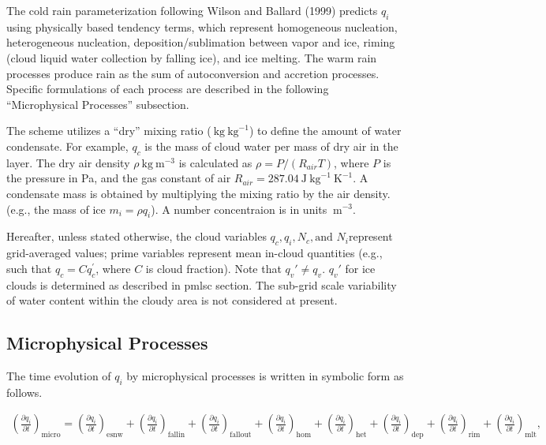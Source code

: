 The cold rain parameterization following Wilson and Ballard (1999)
predicts \(q_i\) using physically based tendency terms, which represent
homogeneous nucleation, heterogeneous nucleation, deposition/sublimation
between vapor and ice, riming (cloud liquid water collection by falling
ice), and ice melting. The warm rain processes produce rain as the sum
of autoconversion and accretion processes. Specific formulations of each
process are described in the following ``Microphysical Processes''
subsection.

The scheme utilizes a ``dry'' mixing ratio
(\(\mathrm{~kg} \mathrm{~kg}^{-1}\)) to define the amount of water
condensate. For example, \(q_c\) is the mass of cloud water per mass of
dry air in the layer. The dry air density
\(\rho \mathrm{~kg} \mathrm{~m}^{-3}\) is calculated as
\(\rho =P/(R_{air}T)\), where \(P\) is the pressure in Pa, and the gas
constant of air
\(R_{air} =287.04 \mathrm{~J} \mathrm{~kg}^{-1} \mathrm{~K}^{-1}\). A
condensate mass is obtained by multiplying the mixing ratio by the air
density. (e.g., the mass of ice \(m_i = \rho q_i\)). A number
concentraion is in units \(\mathrm{~m}^{-3}\).

Hereafter, unless stated otherwise, the cloud variables
\(q_c, q_i,N_c, \text{and } N_i\)represent grid-averaged values; prime
variables represent mean in-cloud quantities (e.g., such that
\(q_c = C q_c^{'}\), where \(C\) is cloud fraction). Note that
\(q_v{'} \neq q_v\). \(q_v{'}\) for ice clouds is determined as
described in pmlsc section. The sub-grid scale variability of water
content within the cloudy area is not considered at present.

\hypertarget{microphysical-processes}{%
\subsection{Microphysical Processes}\label{microphysical-processes}}

The time evolution of \(q_i\) by microphysical processes is written in
symbolic form as follows.

\begin{eqnarray}
\left(\frac{\partial q_i}{\partial t}\right)_{\text {micro}}
=\left(\frac{\partial q_i}{\partial t}\right)_{\text {esnw}}
+\left(\frac{\partial q_i}{\partial t}\right)_{\text {fallin}}
+\left(\frac{\partial q_i}{\partial t}\right)_{\text {fallout}}
+\left(\frac{\partial q_i}{\partial t}\right)_{\text {hom}}
+\left(\frac{\partial q_i}{\partial t}\right)_{\text {het}}
+\left(\frac{\partial q_i}{\partial t}\right)_{\text {dep}}
+\left(\frac{\partial q_i}{\partial t}\right)_{\text {rim}}
+\left(\frac{\partial q_i}{\partial t}\right)_{\text {mlt}},
\end{eqnarray}


